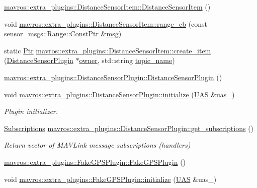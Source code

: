 \begin{DoxyCompactItemize}
\mbox{\hyperlink{group__plugin_ga4a5d2662de657c6d326a0e3dc697d889}{mavros\+::extra\+\_\+plugins\+::\+Distance\+Sensor\+Item\+::\+Distance\+Sensor\+Item}} ()
\item 
void \mbox{\hyperlink{group__plugin_ga57b6fa996ec369d2474ff69c77434917}{mavros\+::extra\+\_\+plugins\+::\+Distance\+Sensor\+Item\+::range\+\_\+cb}} (const sensor\+\_\+msgs\+::\+Range\+::\+Const\+Ptr \&\mbox{\hyperlink{stratnode_8cpp_a82cfe4ed9bc9e1b07c8bf209c324d85b}{msg}})
\item 
static \mbox{\hyperlink{group__plugin_ga0156f4cebc73c6f4b88d5a4053e98c2b}{Ptr}} \mbox{\hyperlink{group__plugin_gae1634c431193fc47e5f577b9e326ea0b}{mavros\+::extra\+\_\+plugins\+::\+Distance\+Sensor\+Item\+::create\+\_\+item}} (\mbox{\hyperlink{classmavros_1_1extra__plugins_1_1DistanceSensorPlugin}{Distance\+Sensor\+Plugin}} $\ast$\mbox{\hyperlink{group__plugin_ga4f45665ceec645c00b6692388d8c0d51}{owner}}, std\+::string \mbox{\hyperlink{group__plugin_gaec60262d11a7bb202f471aa4d6608615}{topic\+\_\+name}})
\item 
\mbox{\hyperlink{group__plugin_gab36caa4b5744d09640626f1cc69671a0}{mavros\+::extra\+\_\+plugins\+::\+Distance\+Sensor\+Plugin\+::\+Distance\+Sensor\+Plugin}} ()
\item 
void \mbox{\hyperlink{group__plugin_gaea43cccb03d7eed62db5d9e9bfc3912a}{mavros\+::extra\+\_\+plugins\+::\+Distance\+Sensor\+Plugin\+::initialize}} (\mbox{\hyperlink{classmavros_1_1UAS}{U\+AS}} \&uas\+\_\+)
\begin{DoxyCompactList}\small\item\em Plugin initializer. \end{DoxyCompactList}\item 
\mbox{\hyperlink{group__plugin_ga8967d61fc77040e0c3ea5a4585d62a09}{Subscriptions}} \mbox{\hyperlink{group__plugin_gafe36c8c7308353863b1a33f4ca497159}{mavros\+::extra\+\_\+plugins\+::\+Distance\+Sensor\+Plugin\+::get\+\_\+subscriptions}} ()
\begin{DoxyCompactList}\small\item\em Return vector of M\+A\+V\+Link message subscriptions (handlers) \end{DoxyCompactList}\item 
\mbox{\hyperlink{group__plugin_ga04d1196da53b8c99546ee75790a2d1ef}{mavros\+::extra\+\_\+plugins\+::\+Fake\+G\+P\+S\+Plugin\+::\+Fake\+G\+P\+S\+Plugin}} ()
\item 
void \mbox{\hyperlink{group__plugin_gafcd498b4d7ddb485258eaade7b3aea3f}{mavros\+::extra\+\_\+plugins\+::\+Fake\+G\+P\+S\+Plugin\+::initialize}} (\mbox{\hyperlink{classmavros_1_1UAS}{U\+AS}} \&uas\+\_\+)

\end{DoxyCompactItemize}
